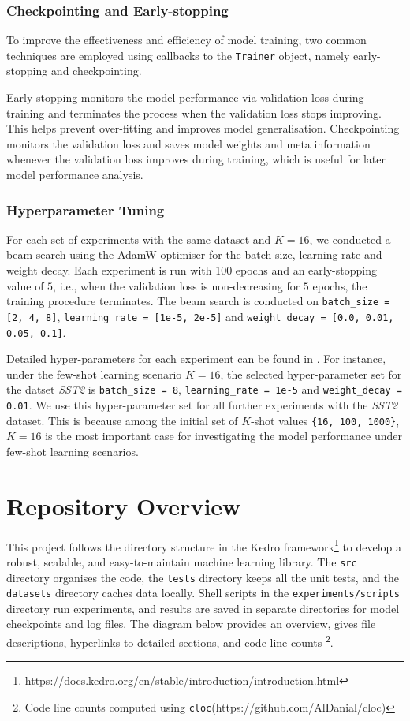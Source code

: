 \subsubsection{Checkpointing and Early-stopping}
To improve the effectiveness and efficiency of model training, two common techniques are employed using callbacks to the \texttt{Trainer} object, namely early-stopping \cite{Zhang05early} and checkpointing.

Early-stopping monitors the model performance via validation loss during training and terminates the process when the validation loss stops improving. This helps prevent over-fitting and improves model generalisation. Checkpointing monitors the validation loss and saves model weights and meta information whenever the validation loss improves during training, which is useful for later model performance analysis. 

\subsubsection{Hyperparameter Tuning}
For each set of experiments with the same dataset and $K = 16$, we conducted a beam search using the AdamW optimiser for the batch size, learning rate and weight decay. Each experiment is run with 100 epochs and an early-stopping value of $5$, i.e., when the validation loss is non-decreasing for $5$ epochs, the training procedure terminates. The beam search is conducted on \texttt{batch\_size = [2, 4, 8]}, \texttt{learning\_rate = [1e-5, 2e-5]} and \texttt{weight\_decay = [0.0, 0.01, 0.05, 0.1]}. 

Detailed hyper-parameters for each experiment can be found in . For instance, under the few-shot learning scenario $K = 16$, the selected hyper-parameter set for the datset \textit{SST2} is \texttt{batch\_size = 8}, \texttt{learning\_rate = 1e-5} and \texttt{weight\_decay = 0.01}. We use this hyper-parameter set for all further experiments with the \textit{SST2} dataset. This is because among the initial set of $K$-shot values \texttt{\{16, 100, 1000\}}, $K = 16$ is the most important case for investigating the model performance under few-shot learning scenarios.

\section{Repository Overview} 
This project follows the directory structure in the Kedro framework\footnote{https://docs.kedro.org/en/stable/introduction/introduction.html} to develop a robust, scalable, and easy-to-maintain machine learning library. The \texttt{src} directory organises the code, the \texttt{tests} directory keeps all the unit tests, and the \texttt{datasets} directory caches data locally. Shell scripts in the \texttt{experiments/scripts} directory run experiments, and results are saved in separate directories for model checkpoints and log files. The diagram below provides an overview, gives file descriptions, hyperlinks to detailed sections, and code line counts \footnote{Code line counts computed using \texttt{cloc}(https://github.com/AlDanial/cloc)}.

